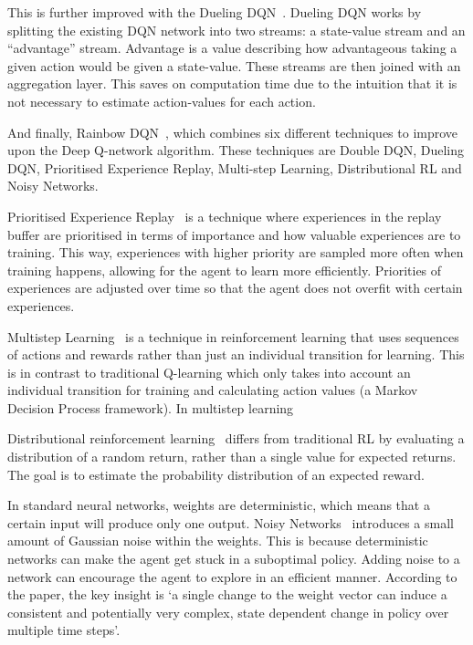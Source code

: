 \documentclass[12pt,a4paper]{article}
\begin{document}
    This is further improved with the Dueling DQN~\citep{wang16}.
    Dueling DQN works by splitting the existing DQN network into two streams: a state-value stream and an ``advantage'' stream.
    Advantage is a value describing how advantageous taking a given action would be given a state-value.
    These streams are then joined with an aggregation layer.
    This saves on computation time due to the intuition that it is not necessary to estimate action-values for each action.

    And finally, Rainbow DQN~\citep{hessel17}, which combines six different techniques to improve upon the Deep Q-network algorithm.
    These techniques are Double DQN, Dueling DQN, Prioritised Experience Replay,
    Multi-step Learning, Distributional RL and Noisy Networks.

    Prioritised Experience Replay~\citep{schaul16} is a technique where experiences in the replay buffer are prioritised in terms of importance and how valuable experiences are to training.
    This way, experiences with higher priority are sampled more often when training happens, allowing for the agent to learn more efficiently.
    Priorities of experiences are adjusted over time so that the agent does not overfit with certain experiences.

    Multistep Learning~\citep[chap.~7.1]{sutton18} is a technique in reinforcement learning that uses sequences of actions and rewards rather than just an individual transition for learning.
    This is in contrast to traditional Q-learning which only takes into account an individual transition for training and calculating action values (a Markov Decision Process framework).
    In multistep learning

    Distributional reinforcement learning~\citep{bellemare17} differs from traditional RL by evaluating a distribution of a random return, rather than a single value for expected returns.
    The goal is to estimate the probability distribution of an expected reward.

    In standard neural networks, weights are deterministic, which means that a certain input will produce only one output.
    Noisy Networks~\citep{fortunato19} introduces a small amount of Gaussian noise within the weights.
    This is because deterministic networks can make the agent get stuck in a suboptimal policy.
    Adding noise to a network can encourage the agent to explore in an efficient manner.
    According to the paper, the key insight is `a single change to the weight vector can induce a consistent and potentially very complex, state dependent change in policy over multiple time steps'.
\end{document}
